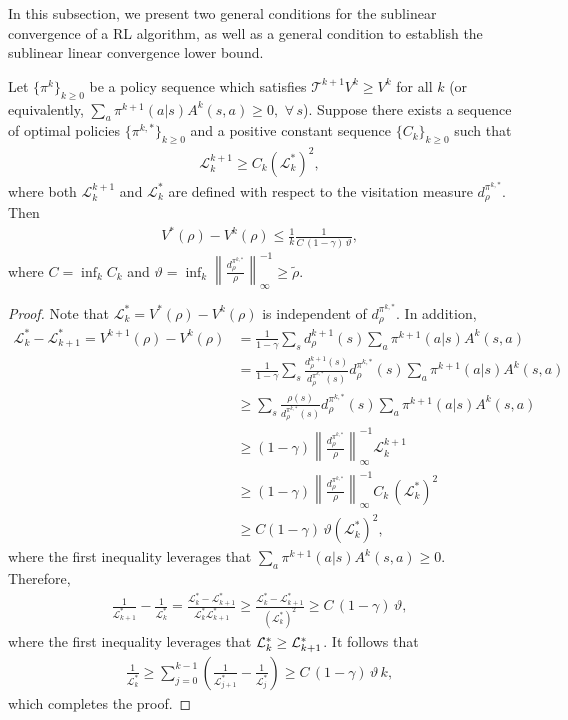 In this subsection, we present two general conditions for the sublinear convergence of a RL algorithm, as well as a general condition to establish the sublinear linear convergence lower bound.
\begin{theorem}\label{thm:sublinear-general}
Let $\{\pi^k\}_{k\geq 0}$ be a policy sequence which satisfies $\mathcal{T}^{k+1}V^k\geq V^k$ for all $k$ \textup{(}or equivalently, $\sum_a\pi^{k+1}(a|s)A^k(s,a)\geq 0,\,\,\forall\, s$\textup{)}. Suppose there exists a sequence of optimal policies $\{\pi^{k,*}\}_{k\geq 0}$ and a positive constant sequence $\{C_k\}_{k\geq 0}$ such that 
\begin{align*}
\mathcal{L}_k^{k+1}\geq C_k\left(\mathcal{L}_k^*\right)^2,
\end{align*}
where both $\mathcal{L}_k^{k+1}$ and $\mathcal{L}_k^*$ are defined with respect to the visitation measure $d_\rho^{\pi^{k,*}}$. Then 
\begin{align*}
V^*(\rho) - V^k(\rho)\leq \frac{1}{k}\frac{1}{C\,(1-\gamma)\,\vartheta},
\end{align*}
where $C = \inf_kC_k$ and $\vartheta=\inf_k\left\|\frac{d_\rho^{\pi^{k,*}}}{\rho}\right\|_\infty^{-1}\geq \tilde{\rho}$.
\end{theorem}
\begin{proof}
Note that $\mathcal{L}_k^*=V^*(\rho)-V^k(\rho)$ is independent of $d_\rho^{\pi^{k,*}}$. In addition,  
\begin{align*}
\mathcal{L}_{k}^*-\mathcal{L}_{k+1}^* = V^{k+1}(\rho) - V^k(\rho) &= \frac{1}{1-\gamma} \sum_s d^{k+1}_\rho(s) \sum_a \pi^{k+1}(a|s) A^k(s,a) \\
&= \frac{1}{1-\gamma} \sum_s \frac{d^{k+1}_\rho(s)}{d^{\pi^{k, *}}_\rho(s)} d^{\pi^{k, *}}_\rho(s) \sum_a \pi^{k+1}(a|s) A^k(s,a)  \\
&\geq \sum_s \frac{\rho(s)}{d^{\pi^{k, *}}_\rho(s)} d^{\pi^{k, *}}_\rho(s) \sum_a \pi^{k+1}(a|s) A^k(s,a)  \\
&\geq (1-\gamma)\left\|\frac{d_\rho^{\pi^{k,*}}}{\rho}\right\|_\infty^{-1}\mathcal{L}_k^{k+1}\\
&\geq (1-\gamma)\left\|\frac{d_\rho^{\pi^{k,*}}}{\rho}\right\|_\infty^{-1}C_k\,\left(\mathcal{L}_k^*\right)^2\\
&\geq C(1-\gamma)\,\vartheta\left(\mathcal{L}_k^*\right)^2,
\end{align*}
where the first inequality leverages that $\sum_a\pi^{k+1}(a|s)A^k(s,a) \geq 0$. Therefore, 
\begin{align*}
\frac{1}{\mathcal{L}_{k+1}^*}-\frac{1}{\mathcal{L}_k^*} = \frac{\mathcal{L}_{k}^*-\mathcal{L}_{k+1}^*}{\mathcal{L}_k^*\mathcal{L}_{k+1}^*}\geq \frac{\mathcal{L}_{k}^*-\mathcal{L}_{k+1}^*}{\left(\mathcal{L}_k^*\right)^2}\geq C\,(1-\gamma)\,\vartheta,
\end{align*}
where the first inequality leverages that ${\cal L}_k^* \geq {\cal L}_{k+1}^*$. It follows that 
\begin{align*}
\frac{1}{\mathcal{L}_k^*}\geq \sum_{j=0}^{k-1}\left(\frac{1}{\mathcal{L}_{j+1}^*}-\frac{1}{\mathcal{L}_j^*}\right)\geq C\,(1-\gamma)\,\vartheta\,k,
\end{align*}
which completes the proof.    
\end{proof}
